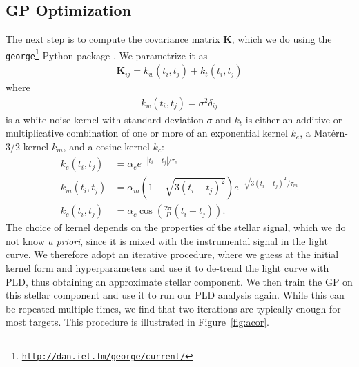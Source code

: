 \documentclass[]{emulateapj}
\begin{document}
\subsection{GP Optimization}
\label{sec:gpopt}
\begin{figure*}[t]
  \begin{center}
    \leavevmode
       \caption{GP optimization procedure for EPIC 201497682. In the top left panel we 
                plot the raw SAP flux (black) and a ten chunk, first order PLD fit
                (red); the residuals are shown in the panel below. These are used to
                compute the power spectrum of the stellar signal (top right), and
                its autocorrelation function (bottom right, black curve). Different
                kernels are then fit to the autocorrelation function, and the one
                with the lowest $\chi^2$ value is chosen for the de-trending step
                (red curve). The grey envelope about the autocorrelation curve is
                the ad hoc standard error assumed to compute $\chi^2$.
                }
     \label{fig:acor}
  \end{center}
\end{figure*}

The next step is to compute the covariance matrix $\mathbf{K}$, which we do using
the \texttt{george}\footnote{\texttt{\url{http://dan.iel.fm/george/current/}}} Python package
\citep{GEORGE}. We parametrize 
it as
\begin{align}
\label{eq:covariance}
\mathbf{K}_{ij} = k_w(t_i, t_j) + k_t(t_i, t_j)
\end{align}
where
\begin{align}
\label{eq:whitekernel}
k_w(t_i, t_j) = \sigma^2\delta_{ij}
\end{align}
is a white noise kernel with standard deviation $\sigma$ and $k_t$ is either an 
additive or multiplicative combination
of one or more of an exponential kernel $k_e$, a Mat\'ern-3/2 kernel $k_m$, and
a cosine kernel $k_c$:
\begin{align}
\label{eq:kernels}
k_e(t_i, t_j) &= \alpha_e e^{-\left|t_i - t_j\right|/\tau_e}\nonumber\\
k_m(t_i, t_j) &= \alpha_m \left(1 + \sqrt{3(t_i - t_j)^2}\right) e^{-\sqrt{3(t_i - t_j)^2}/\tau_m}\nonumber\\ 
k_c(t_i, t_j) &= \alpha_c \cos{\left(\frac{2\pi}{P}(t_i - t_j)\right)}.
\end{align}
The choice of kernel depends on the properties of the stellar signal, which we do
not know \emph{a priori}, since it is mixed with the instrumental signal in the
light curve. We therefore adopt an iterative procedure, where we guess at the initial
kernel form and hyperparameters and use it to de-trend the light curve with PLD, thus
obtaining an approximate stellar component. We then train the GP on this stellar
component and use it to run our PLD analysis again. While this can be repeated
multiple times, we find that two iterations are typically enough for most targets. This procedure
is illustrated in Figure~\ref{fig:acor}.
\end{document}
